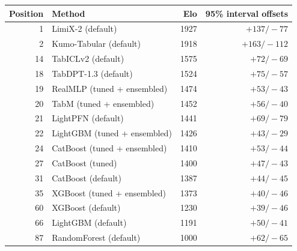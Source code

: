 \begin{tabular}{rlrr}
\toprule
Position & Method & Elo & 95\% interval offsets \\
\midrule
1 & LimiX-2 (default) & 1927 & $+137/-77$ \\
2 & Kumo-Tabular (default) & 1918 & $+163/-112$ \\
14 & TabICLv2 (default) & 1575 & $+72/-69$ \\
18 & TabDPT-1.3 (default) & 1524 & $+75/-57$ \\
19 & RealMLP (tuned + ensembled) & 1474 & $+53/-43$ \\
20 & TabM (tuned + ensembled) & 1452 & $+56/-40$ \\
\rowcolor{orange!12}
21 & LightPFN (default) & 1441 & $+69/-79$ \\
22 & LightGBM (tuned + ensembled) & 1426 & $+43/-29$ \\
24 & CatBoost (tuned + ensembled) & 1410 & $+53/-44$ \\
27 & CatBoost (tuned) & 1400 & $+47/-43$ \\
31 & CatBoost (default) & 1387 & $+44/-45$ \\
35 & XGBoost (tuned + ensembled) & 1373 & $+40/-46$ \\
60 & XGBoost (default) & 1230 & $+39/-46$ \\
66 & LightGBM (default) & 1191 & $+50/-41$ \\
87 & RandomForest (default) & 1000 & $+62/-65$ \\
\bottomrule
\end{tabular}
